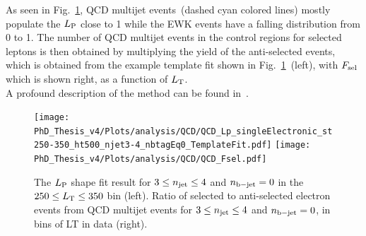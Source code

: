 As seen in Fig.~\ref{fig:QCD}, QCD multijet events~(dashed cyan colored lines) mostly populate the $L_{\rm P}$ close to 1 while the EWK events have a falling distribution from 0 to 1. The number of QCD multijet events in the control regions for selected leptons is then obtained by multiplying the yield of the anti-selected events, which is obtained from the example template fit shown in Fig.~\ref{fig:QCD}~(left), with $F_{\rm sel}$ which is shown right, as a function of $L_{\rm T}$.\\
A profound description of the method can be found in~\cite{David}.
\begin{figure}[!hbt]
    \begin{center}
 \texttt{[image: PhD\_Thesis\_v4/Plots/analysis/QCD/QCD\_Lp\_singleElectronic\_st250-350\_ht500\_njet3-4\_nbtagEq0\_TemplateFit.pdf]}
 \texttt{[image: PhD\_Thesis\_v4/Plots/analysis/QCD/QCD\_Fsel.pdf]}
  \caption{ \label{fig:QCD} The $L_{\rm P}$ shape fit result for $3\leq n_{\rm jet}\leq4$ and $n_{\rm b-jet}=0$ in the $250\leq L_{\rm T}\leq350$ bin (left).  Ratio of selected to anti-selected electron events from QCD multijet events for $3\leq n_{\rm jet}\leq4$ and $n_{\rm b-jet}=0$, in bins of LT in data (right). 
 }
  \end{center}
\end{figure}
